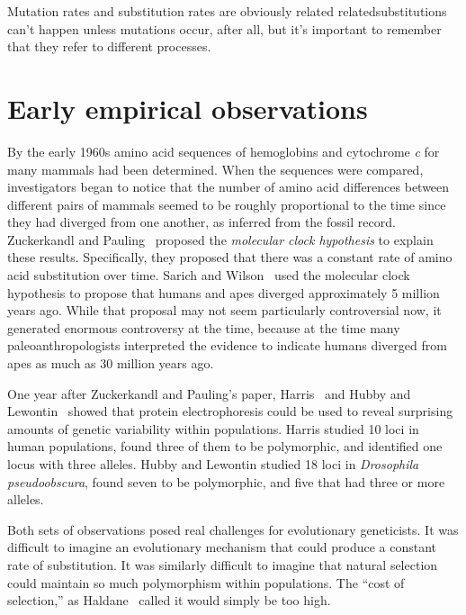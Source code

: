 \documentclass[12pt]{article}
\begin{document}
\noindent Mutation rates and substitution rates are obviously related
related{\dash}substitutions can't happen unless mutations occur, after
all{\dash}, but it's important to remember that they refer to
different processes.

\section*{Early empirical observations}

By the early 1960s amino acid sequences of hemoglobins and cytochrome
{\it c\/} for many mammals had been determined. When the sequences
were compared, investigators began to notice that the number of amino
acid differences between different pairs of mammals seemed to be
roughly proportional to the time since they had diverged from one
another, as inferred from the fossil record. Zuckerkandl and
Pauling~\cite{Zuckerkandl-Pauling65} proposed the {\it molecular clock
hypothesis\/} to explain these results. Specifically, they proposed
that there was a constant rate of amino acid substitution over
time. Sarich and Wilson~\cite{Sarich-Wilson67,Wilson-Sarich69} used
the molecular clock hypothesis to propose that humans and apes
diverged approximately 5 million years ago. While that proposal may
not seem particularly controversial now, it generated enormous
controversy at the time, because at the time many paleoanthropologists
interpreted the evidence to indicate humans diverged from apes as much
as 30 million years ago.

One year after Zuckerkandl and Pauling's paper, Harris~\cite{Harris66}
and Hubby and Lewontin~\cite{Hubby-Lewontin66,Lewontin-Hubby66} showed
that protein electrophoresis could be used to reveal surprising
amounts of genetic variability within populations. Harris studied
10 loci in human populations, found three of them to be polymorphic,
and identified one locus with three alleles. Hubby and Lewontin
studied 18 loci in {\it Drosophila pseudoobscura\/}, found seven to be
polymorphic, and five that had three or more alleles.

Both sets of observations posed real challenges for evolutionary
geneticists. It was difficult to imagine an evolutionary mechanism
that could produce a constant rate of substitution. It was similarly
difficult to imagine that natural selection could maintain so much
polymorphism within populations. The ``cost of selection,'' as
Haldane~\cite{Haldane-1957} called it would simply be too
high.
\end{document}
